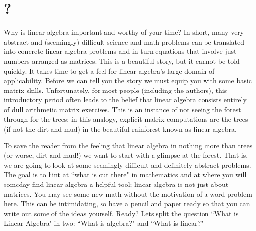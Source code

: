 \chapter{\whatIsTitle?}\label{warmup}



Why is linear algebra important and worthy of your time? 
In short, many very abstract and (seemingly) difficult science and math problems %
can be translated into concrete linear algebra problems and in turn equations that involve just numbers arranged as matrices. 
This is a beautiful story, but it cannot be told quickly. 
It takes time to get a feel for linear algebra's large domain of applicability. 
Before we can tell you the story we must equip you with some basic matrix skills.  
Unfortunately, for most people (including the authors), 
this introductory period often leads to the 
belief that linear algebra consists 
entirely of dull arithmetic matrix exercises. 
This is an instance of not seeing the forest through for the trees; 
in this analogy, explicit matrix computations are the trees (if not the dirt and mud) in the beautiful rainforest known as linear algebra. 

To  save the reader from the feeling that linear algebra in nothing more than trees 
(or worse, dirt and mud!)  
we want to start with a glimpse at the forest. 
That is, we are going to look at some  seemingly difficult and definitely abstract problems. 
The goal is to hint at ``what is out there" in mathematics and at where you will someday find linear algebra a helpful tool; linear algebra is not just about matrices. 
You may see some new math without the motivation of a word problem here.
This can be intimidating, so have a pencil and paper ready so that you can write out some of the ideas yourself. Ready? Lets split the question ``What is Linear Algebra" in two: ``What is algebra?" and  ``What is linear?"\\  





\newpage
\noindent 

